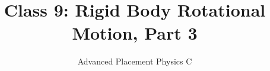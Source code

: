 \documentclass[12pt,compress,aspectratio=169]{beamer}
\title{Class 9: Rigid Body Rotational Motion, Part 3}
\subtitle{Advanced Placement Physics C}
\begin{document}
\begin{frame}
  \maketitle
\end{frame}



%
%
%
%  
%
%
%
%  
%
%
%
%
%
%
%
\end{document}
